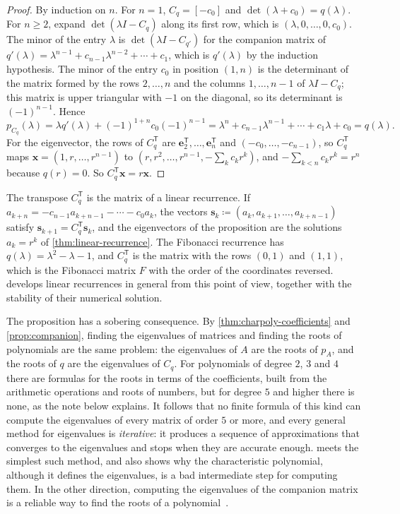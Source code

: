 \begin{proof}
By induction on $n$. For $n=1$, $C_q=[-c_0]$ and $\det(\lambda+c_0)=q(\lambda)$. For $n\ge2$, expand $\det(\lambda I-C_q)$ along its first row, which is $(\lambda,0,\ldots,0,c_0)$. The minor of the entry $\lambda$ is $\det(\lambda I-C_{q'})$ for the companion matrix of $q'(\lambda)=\lambda^{n-1}+c_{n-1}\lambda^{n-2}+\cdots+c_1$, which is $q'(\lambda)$ by the induction hypothesis. The minor of the entry $c_0$ in position $(1,n)$ is the determinant of the matrix formed by the rows $2,\ldots,n$ and the columns $1,\ldots,n-1$ of $\lambda I-C_q$; this matrix is upper triangular with $-1$ on the diagonal, so its determinant is $(-1)^{n-1}$. Hence
\[
p_{C_q}(\lambda)=\lambda q'(\lambda)+(-1)^{1+n}c_0(-1)^{n-1}=\lambda^n+c_{n-1}\lambda^{n-1}+\cdots+c_1\lambda+c_0=q(\lambda).
\]
For the eigenvector, the rows of $C_q^{\mathsf T}$ are $\mathbf e_2^{\mathsf T},\ldots,\mathbf e_n^{\mathsf T}$ and $(-c_0,\ldots,-c_{n-1})$, so $C_q^{\mathsf T}$ maps $\mathbf x=(1,r,\ldots,r^{n-1})$ to $(r,r^2,\ldots,r^{n-1},-\sum_kc_kr^k)$, and $-\sum_{k<n}c_kr^k=r^n$ because $q(r)=0$. So $C_q^{\mathsf T}\mathbf x=r\mathbf x$.
\end{proof}

The transpose $C_q^{\mathsf T}$ is the matrix of a linear recurrence. If $a_{k+n}=-c_{n-1}a_{k+n-1}-\cdots-c_0a_k$, the vectors $\mathbf s_k\coloneqq(a_k,a_{k+1},\ldots,a_{k+n-1})$ satisfy $\mathbf s_{k+1}=C_q^{\mathsf T}\mathbf s_k$, and the eigenvectors of the proposition are the solutions $a_k=r^k$ of \cref{thm:linear-recurrence}. The Fibonacci recurrence has $q(\lambda)=\lambda^2-\lambda-1$, and $C_q^{\mathsf T}$ is the matrix with the rows $(0,1)$ and $(1,1)$, which is the Fibonacci matrix $F$ with the order of the coordinates reversed.  develops linear recurrences in general from this point of view, together with the stability of their numerical solution.

The proposition has a sobering consequence. By \cref{thm:charpoly-coefficients} and \cref{prop:companion}, finding the eigenvalues of matrices and finding the roots of polynomials are the same problem: the eigenvalues of $A$ are the roots of $p_A$, and the roots of $q$ are the eigenvalues of $C_q$. For polynomials of degree $2$, $3$ and $4$ there are formulas for the roots in terms of the coefficients, built from the arithmetic operations and roots of numbers, but for degree $5$ and higher there is none, as the note below explains. It follows that no finite formula of this kind can compute the eigenvalues of every matrix of order $5$ or more, and every general method for eigenvalues is \emph{iterative}: it produces a sequence of approximations that converges to the eigenvalues and stops when they are accurate enough.  meets the simplest such method, and also shows why the characteristic polynomial, although it defines the eigenvalues, is a bad intermediate step for computing them. In the other direction, computing the eigenvalues of the companion matrix is a reliable way to find the roots of a polynomial~\cite{edelman1995}.

